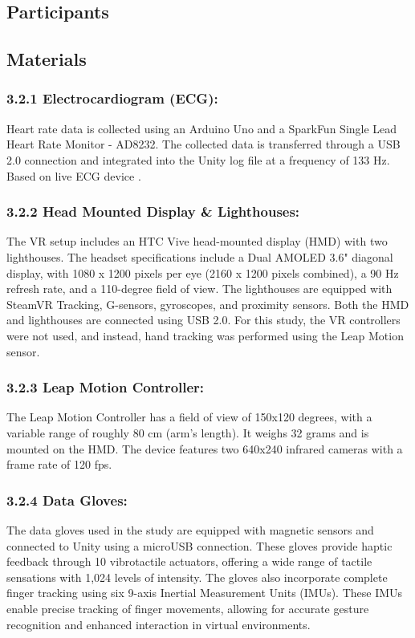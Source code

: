\documentclass[12pt,oneside,openright]{report}
\begin{document}
    \subsection*{Participants}
    \subsection*{Materials}
    \subsubsection*{3.2.1 Electrocardiogram (ECG):}
Heart rate data is collected using an Arduino Uno and a SparkFun Single Lead Heart Rate Monitor - AD8232. The collected data is transferred through a USB 2.0 connection and integrated into the Unity log file at a frequency of 133 Hz. Based on live ECG device \parencite{TimsECG}.

\subsubsection*{3.2.2 Head Mounted Display \& Lighthouses:}
The VR setup includes an HTC Vive head-mounted display (HMD) with two lighthouses. The headset specifications include a Dual AMOLED 3.6" diagonal display, with 1080 x 1200 pixels per eye (2160 x 1200 pixels combined), a 90 Hz refresh rate, and a 110-degree field of view. The lighthouses are equipped with SteamVR Tracking, G-sensors, gyroscopes, and proximity sensors. Both the HMD and lighthouses are connected using USB 2.0. For this study, the VR controllers were not used, and instead, hand tracking was performed using the Leap Motion sensor.

\subsubsection*{3.2.3 Leap Motion Controller:}
The Leap Motion Controller has a field of view of 150x120 degrees, with a variable range of roughly 80 cm (arm's length). It weighs 32 grams and is mounted on the HMD. The device features two 640x240 infrared cameras with a frame rate of 120 fps.

\subsubsection*{3.2.4 Data Gloves:}
The data gloves used in the study are equipped with magnetic sensors and connected to Unity using a microUSB connection. These gloves provide haptic feedback through 10 vibrotactile actuators, offering a wide range of tactile sensations with 1,024 levels of intensity. The gloves also incorporate complete finger tracking using six 9-axis Inertial Measurement Units (IMUs). These IMUs enable precise tracking of finger movements, allowing for accurate gesture recognition and enhanced interaction in virtual environments.
\end{document}
